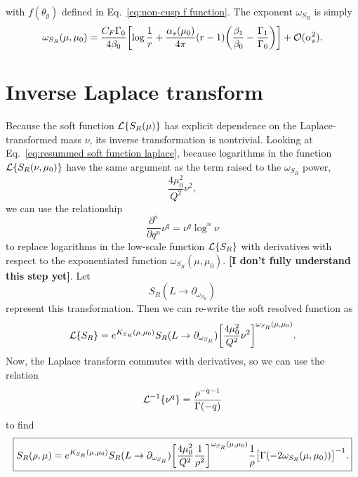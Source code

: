 \documentclass[11pt,twoside,reqno]{amsart}
\theoremstyle{plain}
\theoremstyle{remark}
\theoremstyle{definition}
\theoremstyle{remark}
\theoremstyle{definition}
\theoremstyle{definition}
\newcommand{\cL}{\mathcal{L}}
\newcommand{\cO}{\mathcal{O}}
\begin{document}
	with $f(\theta_g)$ defined in Eq.~\ref{eq:non-cusp f function}. The exponent $\omega_{S_R}$ is simply
	\begin{equation}
		\omega_{S_R}(\mu, \mu_0) = \frac{C_F \Gamma_0}{4\beta_0}\qty[\log \frac{1}{r} + \frac{\alpha_s(\mu_0)}{4\pi}(r - 1)\qty(\frac{\beta_1}{\beta_0} - \frac{\Gamma_1}{\Gamma_0})] + \cO(\alpha_s^2).
	\end{equation}

\section{Inverse Laplace transform}
	Because the soft function $\cL\qty{S_R(\mu)}$ has explicit dependence on the Laplace-transformed mass $\nu$, its inverse transformation is nontrivial. Looking at Eq.~\ref{eq:resummed soft function laplace}, because logarithms in the function $\cL\qty{S_R(\nu, \mu_0)}$ have the same argument as the term raised to the $\omega_{S_R}$ power,
	\begin{equation}
		\frac{4\mu_0^2}{Q^2}\nu^2,
	\end{equation}
	we can use the relationship \cite{frye_factorization_2016,becher_factorization_2007}
	\begin{equation}
		\frac{\partial^n}{\partial q^n}\nu^q = \nu^q \log^n \nu
	\end{equation}
	to replace logarithms in the low-scale function $\cL\qty{S_R}$ with derivatives with respect to the exponentiated function $\omega_{S_R}(\mu, \mu_0)$. {\color{red}\textbf{[I don't fully understand this step yet]}}. Let
	\begin{equation}
		S_R(L \to \partial_{\omega_{S_R}})
	\end{equation}
	represent this transformation. Then we can re-write the soft resolved function as
	\begin{equation}
		\cL\qty{S_R} = e^{K_{S_R}(\mu, \mu_0)}S_R(L \to \partial_{\omega_{S_R}}) \qty[\frac{4\mu_0^2}{Q^2}\nu^2]^{\omega_{S_R}(\mu, \mu_0)}.
	\end{equation}
	Now, the Laplace transform commutes with derivatives, so we can use the relation \cite{frye_factorization_2016}
	\begin{equation}
		\cL^{-1}\qty{\nu^q} = \frac{\rho^{-q-1}}{\Gamma(-q)}
	\end{equation}
	to find
	\begin{equation}
		\boxed{S_R(\rho, \mu) = e^{K_{S_R}(\mu, \mu_0)}S_R(L \to \partial_{\omega_{S_R}}) \qty[\frac{4\mu_0^2}{Q^2}\frac{1}{\rho^2}]^{\omega_{S_R}(\mu, \mu_0)} \frac{1}{\rho} \qty\big[\Gamma\qty(-2\omega_{S_R}(\mu, \mu_0))]^{-1}.}
	\end{equation}
\end{document}
